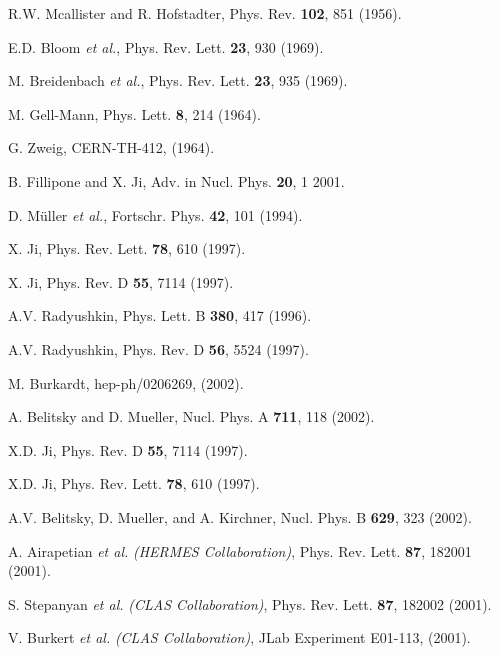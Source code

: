 \newpage
\pagestyle{plain}

\begin{thebibliography}{199}


R.W. Mcallister and R. Hofstadter,  Phys. Rev. {\bf 102}, 851 (1956).

E.D. Bloom {\it et al.}, Phys. Rev. Lett. {\bf 23}, 930 (1969).

M. Breidenbach {\it et al.}, Phys. Rev. Lett. {\bf 23}, 935 (1969).

M. Gell-Mann, Phys. Lett. {\bf 8}, 214 (1964).

G. Zweig, CERN-TH-412, (1964).

B. Fillipone and X. Ji, Adv. in Nucl. Phys.  {\bf 20}, 1 2001.

D. M\"uller {\it et al.}, Fortschr. Phys. {\bf 42}, 101 (1994).

X. Ji, Phys. Rev. Lett. {\bf 78}, 610 (1997).

X. Ji, Phys. Rev. D {\bf 55}, 7114 (1997).

A.V. Radyushkin, Phys. Lett. B {\bf 380}, 417 (1996).

A.V. Radyushkin, Phys. Rev. D {\bf 56}, 5524  (1997).

M. Burkardt, hep-ph/0206269, (2002).

A. Belitsky and D. Mueller, Nucl. Phys. A {\bf 711}, 118 (2002).


X.D. Ji, Phys. Rev. D {\bf 55}, 7114 (1997).

X.D. Ji, Phys. Rev. Lett. {\bf 78}, 610 (1997).

A.V. Belitsky, D. Mueller, and A. Kirchner, Nucl. Phys. B {\bf 629}, 323 
(2002).

A. Airapetian {\it et al.} {\it (HERMES Collaboration)}, Phys. Rev. 
Lett. {\bf 87}, 182001 (2001).

S. Stepanyan {\it et al.} {\it (CLAS Collaboration)}, Phys. Rev. Lett. 
{\bf 87}, 182002 (2001).

V. Burkert {\it et al.} {\it (CLAS Collaboration)}, JLab Experiment E01-113,
(2001).


\end{thebibliography}
